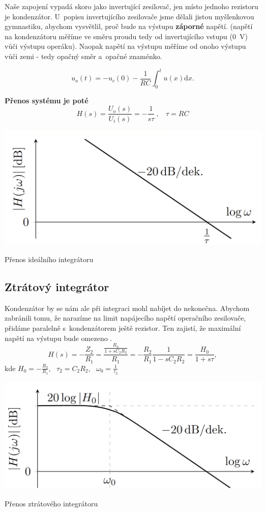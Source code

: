 \documentclass[a4paper,12pt]{article}   %
\begin{document}
Naše zapojení vypadá skoro jako invertující zesilovač, jen místo jednoho rezistoru je kondenzátor. U~popisu invertujícího zesilovače jsme dělali jistou myšlenkovou gymnastiku, abychom vysvětlil, proč bude na výstupu \textbf{záporné} napětí. (napětí na kondenzátoru měříme ve směru proudu tedy od invertujícího vstupu (0~V) vůči výstupu operáku). Naopak napětí na výstupu měříme od onoho výstupu vůči zemi - tedy opačný směr a~opačné znaménko.

\begin{equation*}
    u_o(t) = - u_c(0) - \frac{1}{RC}\int_0^t u(x)\text{d}x.
\end{equation*}

\textbf{Přenos systému je poté}
\begin{equation}
    H(s) = \frac{U_o(s)}{U_i(s)} = -\frac{1}{s\tau}~,~~~~\tau = RC
\end{equation}
\begin{graf}
    \centering
    \includegraphics[width=.7\textwidth]{integrator-ideal-prenos.PNG}
    \caption{Přenos ideálního integrátoru}
\end{graf}

\subsection*{Ztrátový integrátor}
Kondenzátor by se nám ale při integraci mohl nabíjet do nekonečna. Abychom zabránili tomu, že narazíme na limit napájecího napětí operačního zesilovače, přidáme paralelně s~kondenzátorem ještě rezistor. Ten zajistí, že maximální napětí na výstupu bude omezeno .
\begin{equation}
    H(s) = -\frac{Z_2}{R_1} = \frac{\frac{R_2}{1+sC_2R_2}}{R_1} = -\frac{R_2}{R_1}\frac{1}{1-sC_2R_2} = \frac{H_0}{1+s\tau},
\end{equation}
kde $H_0 = -\frac{R_2}{R_1},~~~\tau_2 = C_2 R_2,~~~\omega_0 = \frac{1}{\tau_2}$
\begin{graf}
    \centering
    \includegraphics[width=.7\textwidth]{integrator-real-prenos.PNG}
    \caption{Přenos ztrátového integrátoru}
\end{graf}
\end{document}
